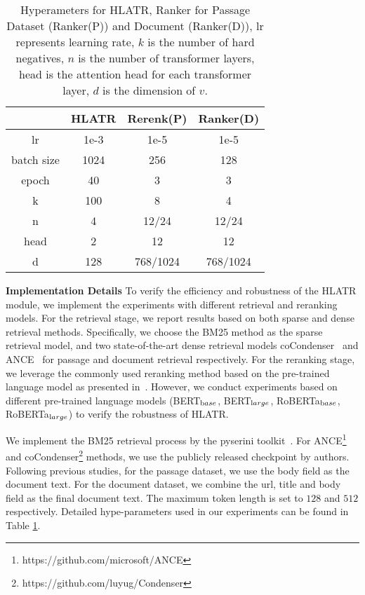 \documentclass[11pt]{article}
\begin{document}
\begin{table}[]
\centering
\caption{Hyperameters for HLATR, Ranker for Passage Dataset (Ranker(P)) and Document (Ranker(D)), lr represents learning rate, $k$ is the number of hard negatives, $n$ is the number of transformer layers, head is the attention head for each transformer layer, $d$ is the dimension of $v$.}
\label{tab:hyper}
\begin{tabular}{c|c|c|c}
\toprule
 & HLATR & Rerenk(P) & Ranker(D)\\ \midrule
lr             & 1e-3 & 1e-5 & 1e-5\\
batch size     & 1024 & 256 & 128\\
epoch          & 40   & 3 & 3\\ 
k              & 100  & 8 & 4 \\
n              & 4    & 12/24 & 12/24\\
head           & 2    & 12 & 12\\
d              & 128  & 768/1024 & 768/1024 \\ \bottomrule
\end{tabular}
\end{table}

\noindent \textbf{Implementation Details} To verify the efficiency and robustness of the HLATR module, we implement the experiments with different retrieval and reranking models. For the retrieval stage, we report results based on both sparse and dense retrieval methods. Specifically, we choose the BM25 method as the sparse retrieval model, and two state-of-the-art dense retrieval models coCondenser~\cite{gao2021unsupervised} and ANCE~\cite{xiong2021approximate} for passage and document retrieval respectively. For the reranking stage, we leverage the commonly used reranking method based on the pre-trained language model as presented in~\cite{nogueira2019passage,gao2021rethink}. However, we conduct experiments based on different pre-trained language models (BERT$_{\text base}$, BERT$_{\text large}$, RoBERTa$_{\text base}$, RoBERTa$_{\text large}$) to verify the robustness of HLATR. 

We implement the BM25 retrieval process by the pyserini toolkit~\cite{lin2021pyserini}. For ANCE\footnote{https://github.com/microsoft/ANCE} and coCondenser\footnote{https://github.com/luyug/Condenser} methods, we use the publicly released checkpoint by authors. Following previous studies, for the passage dataset, we use the body field as the document text. For the document dataset, we combine the url, title and body field as the final document text. The maximum token length is set to $128$ and $512$ respectively. Detailed hype-parameters used in our experiments can be found in Table \ref{tab:hyper}.
\end{document}
